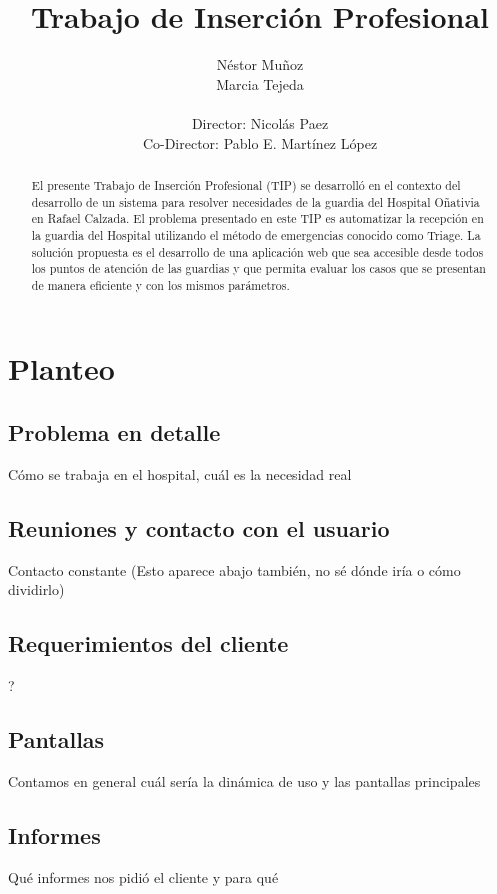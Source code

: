 \documentclass[a4paper,10pt]{article}
\title{Trabajo de Inserción Profesional}
\author{Néstor Muñoz\\ Marcia Tejeda\\ \\ Director: Nicolás Paez \\  Co-Director: Pablo E. Martínez López}
\begin{document}
\maketitle
\newpage 
\begin{abstract}
El presente Trabajo de Inserción Profesional (TIP) se desarrolló en el contexto del desarrollo de un sistema para resolver necesidades de la guardia del Hospital Oñativia en Rafael Calzada.
\linebreak 
El problema presentado en este TIP es automatizar la recepción en la guardia del Hospital utilizando el método de emergencias conocido como Triage. 
\linebreak 
La solución propuesta es el desarrollo de una aplicación web que sea accesible desde todos los puntos de atención de las guardias y que permita evaluar los casos que se presentan de manera eficiente y con los mismos parámetros.

\end{abstract}


\newpage 
\tableofcontents


\newpage 


\newpage 
\section{Planteo}
\subsection{Problema en detalle}
Cómo se trabaja en el hospital, cuál es la necesidad real
\subsection{Reuniones y contacto con el usuario}
Contacto constante (Esto aparece abajo también, no sé dónde iría o cómo dividirlo)
\subsection{Requerimientos del cliente}
?
\subsection{Pantallas}
Contamos en general cuál sería la dinámica de uso y las pantallas principales
\subsection{Informes}
Qué informes nos pidió el cliente y para qué
\end{document}
